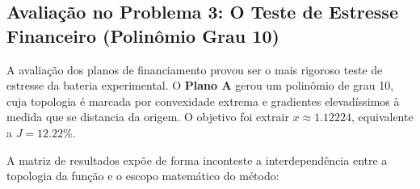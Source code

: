 \subsection{Avaliação no Problema 3: O Teste de Estresse Financeiro (Polinômio Grau 10)}
\label{subsec:comparativo_juros}

A avaliação dos planos de financiamento provou ser o mais rigoroso teste de estresse da bateria experimental. O \textbf{Plano A} gerou um polinômio de grau 10, cuja topologia é marcada por convexidade extrema e gradientes elevadíssimos à medida que se distancia da origem. O objetivo foi extrair $x \approx 1.12224$, equivalente a $J = 12.22\%$.

\begin{table}[htpb]
\centering
\caption{Quadro comparativo crítico para o Problema 3 (Plano A - Grau 10).}
\label{tab:comparativo_prob3}
\small
{}
\end{table}

A matriz de resultados expõe de forma inconteste a interdependência entre a topologia da função e o escopo matemático do método:

